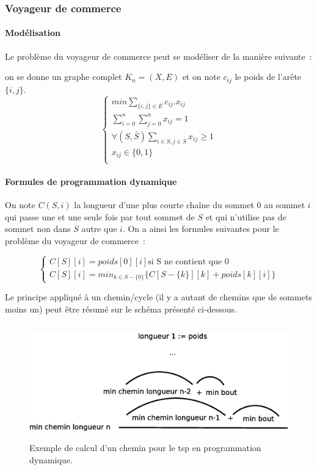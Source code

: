 \documentclass[a4paper, 12pt]{article}
\begin{document}
\subsubsection{Voyageur de commerce}

\paragraph{Modélisation}

Le problème du voyageur de commerce peut se modéliser de la manière
suivante~:


on se donne un graphe complet $K_n=(X,E)$ et on note $c_{ij}$ le poids
de l'arête $\{i,j\}$.
\begin{equation}
\begin{cases}
min \sum_{\{i, j\} \in E} c_{ij}.x_{ij} \\
\sum_{i=0}^n \sum_{j=0}^n x_{ij} = 1 \\
\forall (S, \bar{S}) \sum_{i \in S, j \in \bar{S}} x_{ij} \geq 1 \\
x_{ij} \in \{0, 1\} \\
\end{cases}
\end{equation}

\paragraph{Formules de programmation dynamique}

On note $C(S,i)$ la longueur d'une plus courte chaîne du sommet $0$ au
sommet $i$ qui passe une et une seule fois par tout sommet de $S$ et
qui n'utilise pas de sommet non dans $S$ autre que $i$. On a ainsi les
formules suivantes pour le problème du voyageur de commerce~:

\begin{equation}
\begin{cases}
C[S][i] = poids[0][i] \text{si S ne contient que $0$} \\
C[S][i] = min_{k \in S - \{ 0 \}} \{ C[S- \{ k \}][k] + poids[k][i]  \}
\end{cases}
\end{equation}

Le principe appliqué à un chemin/cycle (il y a autant de chemins que de
sommets moins un) peut être résumé sur le schéma présenté ci-dessous.

\begin{figure}[!ht]
\begin{center}
\includegraphics[height=5cm]{tspDyn.eps}
\end{center}
\caption{Exemple de calcul d'un chemin pour le tsp en programmation dynamique.}
\end{figure}
\end{document}
